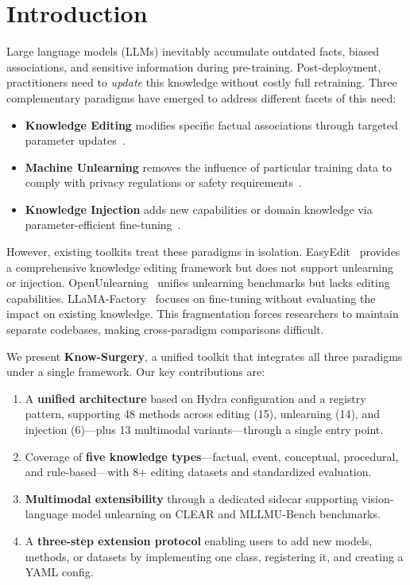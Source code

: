 \section{Introduction}
\label{sec:intro}

Large language models (LLMs) inevitably accumulate outdated facts, biased associations, and sensitive information during pre-training.
Post-deployment, practitioners need to \textit{update} this knowledge without costly full retraining.
Three complementary paradigms have emerged to address different facets of this need:

\begin{itemize}
\setlength\itemsep{0pt}
\item \textbf{Knowledge Editing} modifies specific factual associations through targeted parameter updates~\cite{meng2022rome,meng2023memit,mitchell2022mend}.
\item \textbf{Machine Unlearning} removes the influence of particular training data to comply with privacy regulations or safety requirements~\cite{maini2024tofu,shi2024muse}.
\item \textbf{Knowledge Injection} adds new capabilities or domain knowledge via parameter-efficient fine-tuning~\cite{hu2022lora,liu2024dora}.
\end{itemize}

However, existing toolkits treat these paradigms in isolation.
EasyEdit~\cite{wang2024easyedit} provides a comprehensive knowledge editing framework but does not support unlearning or injection.
OpenUnlearning~\cite{dorna2025openunlearning} unifies unlearning benchmarks but lacks editing capabilities.
LLaMA-Factory~\cite{zheng2024llamafactory} focuses on fine-tuning without evaluating the impact on existing knowledge.
This fragmentation forces researchers to maintain separate codebases, making cross-paradigm comparisons difficult.

We present \textbf{Know-Surgery}, a unified toolkit that integrates all three paradigms under a single framework.
Our key contributions are:

\begin{enumerate}
\setlength\itemsep{0pt}
\item A \textbf{unified architecture} based on Hydra configuration and a registry pattern, supporting 48 methods across editing (15), unlearning (14), and injection (6)---plus 13 multimodal variants---through a single entry point.
\item Coverage of \textbf{five knowledge types}---factual, event, conceptual, procedural, and rule-based---with 8+ editing datasets and standardized evaluation.
\item \textbf{Multimodal extensibility} through a dedicated sidecar supporting vision-language model unlearning on CLEAR and MLLMU-Bench benchmarks.
\item A \textbf{three-step extension protocol} enabling users to add new models, methods, or datasets by implementing one class, registering it, and creating a YAML config.
\end{enumerate}
